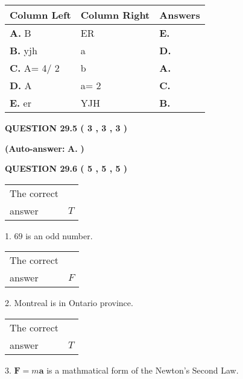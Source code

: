 \documentclass[12pt]{article}
\begin{document}
  
\begin{tabular}{|l|l|l|}
 \hline
 Column Left & Column Right  & Answers       \\ 
 \hline
{\textbf{\large{
A.}}}
B
  & 
ER
 & 
{\textbf{\large{
E.}}}
 \\ 
 \hline
{\textbf{\large{
B.}}}
yjh
  & 
a
 & 
{\textbf{\large{
D.}}}
 \\ 
 \hline
{\textbf{\large{
C.}}}
 A= %
4/ %
2

  & 
b
 & 
{\textbf{\large{
A.}}}
 \\ 
 \hline
{\textbf{\large{
D.}}}
A
  & 
 a= %
2
 & 
{\textbf{\large{
C.}}}
 \\ 
 \hline
{\textbf{\large{
E.}}}
er
  & 
YJH
 & 
{\textbf{\large{
B.}}}
 \\ 
 \hline
 \end{tabular}
  
  
\noindent{}
 
 
  
  
{\textbf{\large{QUESTION
29.5 
 (           3 ,           3 ,           3 )
}}}
 
 
{\textbf{(Auto-answer:}}
{\textbf{\large{
A.}}}
{\textbf{)}}
 
 
  
  
{\textbf{\large{QUESTION
29.6 
 (           5 ,           5 ,           5 )
}}}

 
\noindent\begin{tabular}{|l|l|}\hline The correct & \\
          answer &  %
$T$ \\ \hline \end{tabular}
1. $ %
69$ is an  %
odd number.
 
\noindent\begin{tabular}{|l|l|}\hline The correct & \\
          answer &  %
$F$ \\ \hline \end{tabular}
2.  %
Montreal is in  %
Ontario province.
 
\noindent\begin{tabular}{|l|l|}\hline The correct & \\
          answer &  %
$T$ \\ \hline \end{tabular}
3.  %
$\mathbf{F}=m\mathbf{a}$ is a mathmatical form of  %
the Newton's Second Law.
 
  
  
\end{document}
